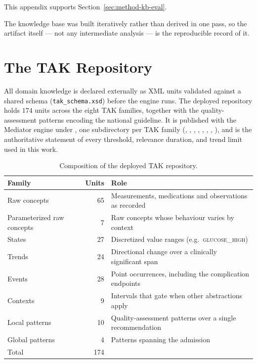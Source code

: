 This appendix supports Section~\ref{sec:method-kb-eval}.

The knowledge base was built iteratively rather than derived in one pass, so the artifact itself --- not any intermediate analysis --- is the reproducible record of it.

\section{The TAK Repository}
\label{app:kb-artifacts}

All domain knowledge is declared externally as XML units validated against a shared schema (\texttt{tak\_schema.xsd}) before the engine runs. The deployed repository holds $174$ units across the eight TAK families, together with the quality-assessment patterns encoding the national guideline. It is published with the Mediator engine \citep{mediator-github} under , one subdirectory per TAK family (, , , , , , , ), and is the authoritative statement of every threshold, relevance duration, and trend limit used in this work.

\begin{table}[htbp]
\centering
\singlespacing
\caption{Composition of the deployed TAK repository.}
\label{tab:tak-composition}
\small
\begin{tabular}{lrl}
\toprule
Family & Units & Role \\
\midrule
Raw concepts                & 65 & Measurements, medications and observations as recorded \\
Parameterized raw concepts  & 7  & Raw concepts whose behaviour varies by context \\
States                      & 27 & Discretized value ranges (e.g.\ \textsc{glucose\_high}) \\
Trends                      & 24 & Directional change over a clinically significant span \\
Events                      & 28 & Point occurrences, including the complication endpoints \\
Contexts                    & 9  & Intervals that gate when other abstractions apply \\
Local patterns              & 10 & Quality-assessment patterns over a single recommendation \\
Global patterns             & 4  & Patterns spanning the admission \\
\midrule
Total                       & 174 & \\
\bottomrule
\end{tabular}
\end{table}

